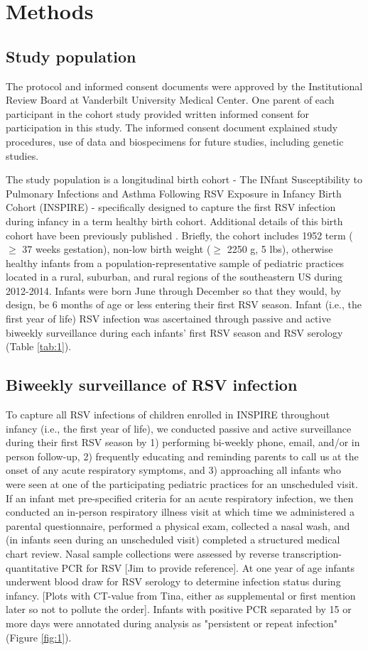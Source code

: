 \documentclass{article}
\begin{document}
\section{Methods}
\subsection{Study population}
The protocol and informed consent documents were approved by the Institutional Review Board at Vanderbilt University Medical Center. 
One parent of each participant in the cohort study provided written informed consent for participation in this study. 
The informed consent document explained study procedures, use of data and biospecimens for future studies, including genetic studies.

The study population is a longitudinal birth cohort - The INfant Susceptibility to Pulmonary Infections and Asthma Following RSV Exposure in Infancy Birth Cohort (INSPIRE) - specifically designed to capture the first RSV infection during infancy in a term healthy birth cohort. 
Additional details of this birth cohort have been previously published 
\cite{larkin_objectives_2015}.
Briefly, the cohort includes 1952 term ($\ge$ 37 weeks gestation), non-low birth weight ($\ge$ 2250 g, 5 lbs), otherwise healthy infants from a population-representative sample of pediatric practices located in a rural, suburban, and rural regions of the southeastern US during 2012-2014. 
Infants were born June through December so that they would, by design, be 6 months of age or less entering their first RSV season. 
Infant (i.e., the first year of life) RSV infection was ascertained through passive and active biweekly surveillance during each infants' first RSV season and RSV serology
(Table \ref{tab:1}).

\subsection{Biweekly surveillance of RSV infection}
To capture all RSV infections of children enrolled in INSPIRE throughout infancy (i.e., the first year of life), we conducted passive and active surveillance during their first RSV season by 1) performing bi-weekly phone, email, and/or in person follow-up, 2) frequently educating and reminding parents to call us at the onset of any acute respiratory symptoms, and 3) approaching all infants who were seen at one of the participating pediatric practices for an unscheduled visit. 
If an infant met pre-specified criteria for an acute respiratory infection, we then conducted an in-person respiratory illness visit at which time we administered a parental questionnaire, performed a physical exam, collected a nasal wash, and (in infants seen during an unscheduled visit) completed a structured medical chart review.
Nasal sample collections were assessed by reverse transcription-quantitative PCR for RSV [Jim to provide reference].
At one year of age infants underwent blood draw for RSV serology to determine infection status during infancy. 
[Plots with CT-value from Tina, either as supplemental or first mention later so not to pollute the order].
Infants with positive PCR separated by 15 or more days were annotated during analysis as "persistent or repeat infection"
(Figure \ref{fig:1}).
\end{document}

